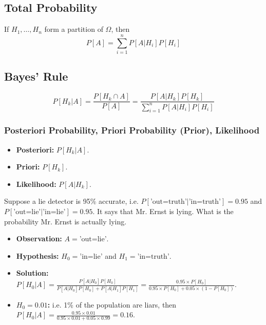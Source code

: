 \begin{faq}

\end{faq}

\subsection{Total Probability}
\begin{definition}
    If $H_1,\ldots,H_n$ form a partition of $\Omega$, then
    \begin{equation}
        P[A] = \sum_{i=1}^{n} P[A|H_i]P[H_i]
    \end{equation}
\end{definition}

\subsection{Bayes' Rule}
\begin{definition}
    \begin{equation}
        P[H_k|A] = \frac{P[H_k \cap A]}{P[A]} = \frac{P[A|H_k]P[H_k]}{\sum_{i=1}^{n} P[A|H_i]P[H_i]}
    \end{equation}
\end{definition}

\subsubsection{Posteriori Probability, Priori Probability (Prior), Likelihood}
\begin{definition}
    \begin{itemize}
        \item \textbf{Posteriori:} $P[H_k|A]$.
        \item \textbf{Priori:} $P[H_k]$.
        \item \textbf{Likelihood:} $P[A|H_k]$.
    \end{itemize}
\end{definition}

\begin{example}
    Suppose a lie detector is 95\% accurate, i.e. $P[\text{'out=truth'}|\text{'in=truth'}] = 0.95$ and $P[\text{'out=lie'}|\text{'in=lie'}] = 0.95$. It says that Mr. Ernst is lying. What is the probability Mr. Ernst is actually lying.
    \begin{itemize}
        \item \textbf{Observation:} $A = \text{'out=lie'}$.
        \item \textbf{Hypothesis:} $H_0 = \text{'in=lie'}$ and $H_1 = \text{'in=truth'}$.
        \item \textbf{Solution:} $P[H_0|A] = \frac{P[A|H_0]P[H_0]}{P[A|H_0]P[H_0] + P[A|H_1]P[H_1]} = \frac{0.95 \times P[H_0]}{0.95 \times P[H_0] + 0.05 \times (1 - P[H_0])}$.
        \item \textbf{$H_0 = 0.01$:} i.e. 1\% of the population are liars, then $P[H_0|A] = \frac{0.95 \times 0.01}{0.95 \times 0.01 + 0.05 \times 0.99} = 0.16$.
    \end{itemize}
\end{example}

